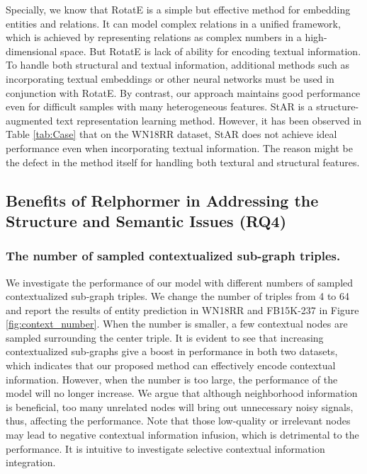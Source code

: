 \documentclass[sigconf]{acmart}
\begin{document}
Specially, we know that RotatE is a simple but effective method for embedding entities and relations. 
It can model complex relations in a unified framework, which is achieved by representing relations as complex numbers in a high-dimensional space.
But RotatE is lack of ability for encoding textual information.
To handle both structural and textual information, additional methods such as incorporating textual embeddings or other neural networks must be used in conjunction with RotatE.
By contrast, our approach maintains good performance even for difficult samples with many heterogeneous features.
StAR is a structure-augmented text representation learning method.
However, it has been observed in Table \ref{tab:Case}  that on the WN18RR dataset, StAR does not achieve ideal performance even when incorporating textual information.
The reason might be the defect in the method itself for handling both textural and structural features.



\subsection{Benefits of Relphormer in Addressing the Structure and Semantic Issues (RQ4)}

\subsubsection{\textbf{The number of sampled contextualized sub-graph triples.}}
We investigate the performance of our model with different numbers of sampled contextualized sub-graph triples.
We change the number of triples from 4 to 64 and report the results of entity prediction in WN18RR and FB15K-237 in Figure \ref{fig:context_number}.
When the number is smaller, a few contextual nodes are sampled surrounding the center triple. 
It is evident to see that increasing contextualized sub-graphs give a boost in performance in both two datasets, which indicates that our proposed method can effectively encode contextual information.
However, when the number is too large, the performance of the model will no longer increase.
We argue that although neighborhood information is beneficial, too many unrelated nodes will bring out unnecessary noisy signals, thus, affecting the performance.
Note that those low-quality or irrelevant nodes may lead to negative contextual information infusion, which is detrimental to the performance. 
It is intuitive to investigate selective contextual information integration.
\end{document}
